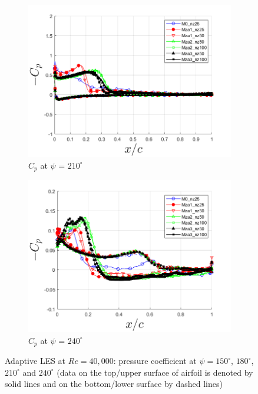 \begin{figure}[H]
\begin{subfigure}[b]{0.475\textwidth}
\centering
\includegraphics[width=1\textwidth]{figures/zonal_adapt_results/Cp/phase_210.png}
\caption{ $C_p$ at $\psi$ = $210^\circ$}
\label{fig:zonal_Cp_210}
\end{subfigure}
\begin{subfigure}[b]{0.475\textwidth}
\centering
\includegraphics[width=1\textwidth]{figures/zonal_adapt_results/Cp/phase_240.png}
\caption{ $C_p$ at $\psi$ = $240^\circ$}
\label{fig:zonal_Cp_240}
\end{subfigure}
\caption{Adaptive LES at $Re=40,000$: pressure coefficient at $\psi=150^\circ$, $180^\circ$, $210^\circ$ and $240^\circ$ (data on the top/upper surface of airfoil is denoted by solid lines and on the bottom/lower surface by dashed lines)}
\label{fig:zonal_Cp_plots_LEV}
\end{figure}

